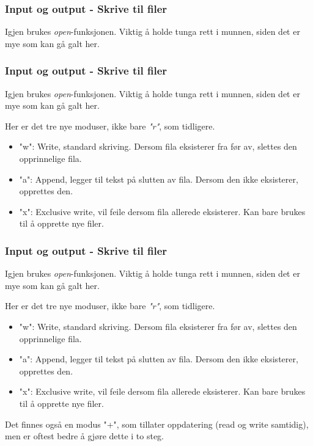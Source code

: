
\begin{frame}
    \frametitle{Input og output - Skrive til filer}

    Igjen brukes \textit{open}-funksjonen. Viktig å holde tunga rett i munnen, siden det er mye som kan gå galt her.

\end{frame}


\begin{frame}[fragile]
    \frametitle{Input og output - Skrive til filer}

    Igjen brukes \textit{open}-funksjonen. Viktig å holde tunga rett i munnen, siden det er mye som kan gå galt her.

    Her er det tre nye moduser, ikke bare \textit{"r"}, som tidligere. 

    \begin{itemize}
        \item "w": Write, standard skriving. Dersom fila eksisterer fra før av, slettes den opprinnelige fila. 
        \item "a": Append, legger til tekst på slutten av fila. Dersom den ikke eksisterer, opprettes den. 
        \item "x": Exclusive write, vil feile dersom fila allerede eksisterer. Kan bare brukes til å opprette nye filer. 
    \end{itemize}

\end{frame}

\begin{frame}[fragile]
    \frametitle{Input og output - Skrive til filer}

    Igjen brukes \textit{open}-funksjonen. Viktig å holde tunga rett i munnen, siden det er mye som kan gå galt her.

    Her er det tre nye moduser, ikke bare \textit{"r"}, som tidligere. 

    \begin{itemize}
        \item "w": Write, standard skriving. Dersom fila eksisterer fra før av, slettes den opprinnelige fila. 
        \item "a": Append, legger til tekst på slutten av fila. Dersom den ikke eksisterer, opprettes den. 
        \item "x": Exclusive write, vil feile dersom fila allerede eksisterer. Kan bare brukes til å opprette nye filer. 
    \end{itemize}

    Det finnes også en modus "+", som tillater oppdatering (read og write samtidig), men er oftest bedre å gjøre dette i to steg. 

\end{frame}

